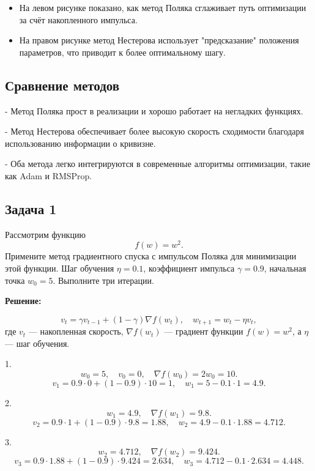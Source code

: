 \begin{itemize}
    \item На левом рисунке показано, как метод Поляка сглаживает путь оптимизации за счёт накопленного импульса.
    \item На правом рисунке метод Нестерова использует "предсказание" положения параметров, что приводит к более оптимальному шагу.
\end{itemize}

\subsection*{Сравнение методов}
    \item - Метод Поляка прост в реализации и хорошо работает на негладких функциях.

    \item - Метод Нестерова обеспечивает более высокую скорость сходимости благодаря использованию информации о кривизне.

    \item - Оба метода легко интегрируются в современные алгоритмы оптимизации, такие как Adam и RMSProp.

\subsection*{Задача 1}
Рассмотрим функцию
\[
f(w) = w^2.
\]
Примените метод градиентного спуска с импульсом Поляка для минимизации этой функции. Шаг обучения $\eta = 0.1$, коэффициент импульса $\gamma = 0.9$, начальная точка $w_0 = 5$. Выполните три итерации.

\textbf{Решение:}

\[
v_t = \gamma v_{t-1} + (1 - \gamma) \nabla f(w_t), \quad w_{t+1} = w_t - \eta v_t,
\]
где $v_t$ — накопленная скорость, $\nabla f(w_t)$ — градиент функции $f(w) = w^2$, а $\eta$ — шаг обучения.

1.
   \[
   w_0 = 5, \quad v_0 = 0, \quad \nabla f(w_0) = 2w_0 = 10.
   \]
   \[
   v_1 = 0.9 \cdot 0 + (1 - 0.9) \cdot 10 = 1, \quad w_1 = 5 - 0.1 \cdot 1 = 4.9.
   \]

2.
   \[
   w_1 = 4.9, \quad \nabla f(w_1) = 9.8.
   \]
   \[
   v_2 = 0.9 \cdot 1 + (1 - 0.9) \cdot 9.8 = 1.88, \quad w_2 = 4.9 - 0.1 \cdot 1.88 = 4.712.
   \]

3.
   \[
   w_2 = 4.712, \quad \nabla f(w_2) = 9.424.
   \]
   \[
   v_3 = 0.9 \cdot 1.88 + (1 - 0.9) \cdot 9.424 = 2.634, \quad w_3 = 4.712 - 0.1 \cdot 2.634 = 4.448.
   \]

